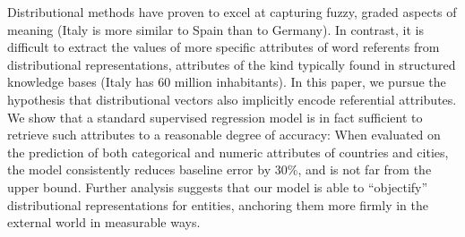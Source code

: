 Distributional methods have proven to excel at capturing fuzzy, graded aspects of meaning (Italy is more similar to Spain than to Germany). In contrast, it is difficult to extract the values of more specific attributes of word referents from distributional representations, attributes of the kind typically found in structured knowledge bases (Italy has 60 million inhabitants).  In this paper, we pursue the hypothesis that distributional vectors also implicitly encode referential attributes. We show that a standard supervised regression model is in fact sufficient to retrieve such attributes to a reasonable degree of accuracy: When evaluated on the prediction of both categorical and numeric attributes of countries and cities, the model consistently reduces baseline error by 30\%, and is not far from the upper bound. Further analysis suggests that our model is able to ``objectify'' distributional representations for entities, anchoring them more firmly in the external world in measurable ways.
